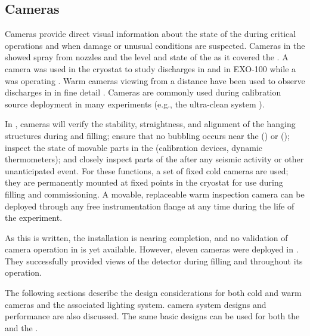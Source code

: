 \subsection{Cameras}

Cameras provide direct visual information about the state of the
 during critical operations and when damage or unusual
conditions are suspected.  Cameras in the  showed spray from \cooldown
nozzles and the level and state of the \lar as it covered the  \cite{Murphy:20170516}.  A camera was
used in the  
cryostat\cite{Adamowski:2014daa} to study  discharges in
\lar and in EXO-100 while a  was operating
\cite{Delaquis:2013hva}.  Warm cameras viewing \lar from a distance
have been used to observe  discharges in \lar in
fine detail \cite{Auger:2015xlo}.  Cameras are commonly used during
calibration source deployment in many experiments (e.g., the
\kamland ultra-clean system \cite{Banks:2014hra}).

In , cameras will verify the stability, straightness,
and alignment of the hanging  structures during \cooldown and
filling; ensure that no bubbling occurs near the 
(\single) or  (\dual); inspect the
state of movable parts in the  (calibration devices, dynamic
thermometers); and closely inspect parts of the  after any seismic activity or other unanticipated
event.  For these functions, a set of fixed
cold cameras are used; they are permanently mounted at fixed points in the cryostat
for use during filling and commissioning. A movable, replaceable
warm inspection camera can be deployed through any free
instrumentation flange at any time during the life of the
experiment. 
 
As this is written, the  installation is nearing completion, and no validation of camera operation in  is yet available.   However,
eleven cameras were deployed in .
They successfully provided views of the detector during filling and throughout
its operation. %

The following sections describe the design considerations for both cold
and warm cameras and the associated lighting system.  camera system designs and performance are also discussed.  
The same basic
designs can be used for both the  and the . %



